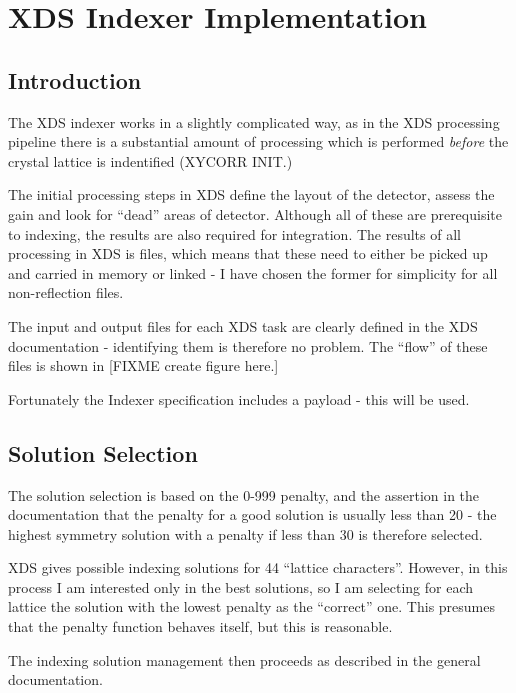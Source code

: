 \documentclass[a4paper, 11pt]{article}
\begin{document}
\section{XDS Indexer Implementation}

\subsection{Introduction}

The XDS indexer works in a slightly complicated way, as in the XDS processing
pipeline there is a substantial amount of processing which is performed 
\emph{before} the crystal lattice is indentified (XYCORR INIT.)

The initial processing steps in XDS define the layout of the detector, assess
the gain and look for ``dead'' areas of detector. Although all of these are
prerequisite to indexing, the results are also required for integration.
The results of all processing in XDS is files, which means that these 
need to either be picked up and carried in memory or linked - I have chosen the
former for simplicity for all non-reflection files.

The input and output files for each XDS task are clearly defined in the XDS
documentation - identifying them is therefore no problem. The ``flow'' of
these files is shown in [FIXME create figure here.]

Fortunately the Indexer specification includes a payload - this will be used.

\subsection{Solution Selection}

The solution selection is based on the 0-999 penalty, and the assertion in
the documentation that the penalty for a good solution is usually less than
20 - the highest symmetry solution with a penalty if less than 30 is therefore
selected.

XDS gives possible indexing solutions for 44 ``lattice characters''. However, 
in this process I am interested only in the best solutions, so I am selecting
for each lattice the solution with the lowest penalty as the ``correct'' one.
This presumes that the penalty function behaves itself, but this is reasonable.

The indexing solution management then proceeds as described in the general
documentation.
\end{document}
